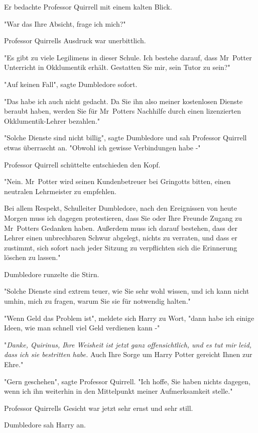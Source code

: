 {Er bedachte Professor Quirrell mit einem kalten Blick.

"War das Ihre Absicht, frage ich mich?"

Professor Quirrells Ausdruck war unerbittlich.

"Es gibt zu viele Legilimens in dieser Schule. Ich bestehe darauf, dass Mr~Potter Unterricht in Okklumentik erhält. Gestatten Sie mir, sein Tutor zu sein?"

"Auf keinen Fall", sagte Dumbledore sofort.

"Das habe ich auch nicht gedacht. Da Sie ihn also meiner kostenlosen Dienste beraubt haben, werden Sie für Mr~Potters Nachhilfe durch einen lizenzierten Okklumentik-Lehrer bezahlen."

"Solche Dienste sind nicht billig", sagte Dumbledore und sah Professor Quirrell etwas überrascht an. "Obwohl ich gewisse Verbindungen habe -"

Professor Quirrell schüttelte entschieden den Kopf.

"Nein. Mr~Potter wird seinen Kundenbetreuer bei Gringotts bitten, einen neutralen Lehrmeister zu empfehlen.

Bei allem Respekt, Schulleiter Dumbledore, nach den Ereignissen von heute Morgen muss ich dagegen protestieren, dass Sie oder Ihre Freunde Zugang zu Mr~Potters Gedanken haben. Außerdem muss ich darauf bestehen, dass der Lehrer einen unbrechbaren Schwur abgelegt, nichts zu verraten, und dass er zustimmt, sich sofort nach jeder Sitzung zu verpflichten sich die Erinnerung löschen zu lassen."

Dumbledore runzelte die Stirn.

"Solche Dienste sind extrem teuer, wie Sie sehr wohl wissen, und ich kann nicht umhin, mich zu fragen, warum Sie sie für notwendig halten."

"Wenn Geld das Problem ist", meldete sich Harry zu Wort, "dann habe ich einige Ideen, wie man schnell viel Geld verdienen kann -"

"\emph{Danke, Quirinus, Ihre Weisheit ist jetzt ganz offensichtlich, und es tut mir leid, dass ich sie bestritten habe.} Auch Ihre Sorge um Harry Potter gereicht Ihnen zur Ehre."

"Gern geschehen", sagte Professor Quirrell. "Ich hoffe, Sie haben nichts dagegen, wenn ich ihn weiterhin in den Mittelpunkt meiner Aufmerksamkeit stelle."

Professor Quirrells Gesicht war jetzt sehr ernst und sehr still.

Dumbledore sah Harry an.

}
